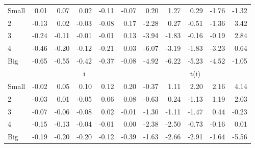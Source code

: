 \begin{table}[!ht]
\begin{tabular}{lrrrrrrrrrr}
    \\
      \cmidrule(r){2-6} \cmidrule(r){7-11}

    Small   & 0.01  & 0.07  & 0.02  & -0.11  & -0.07  & 0.20  & 1.27  & 0.29  & -1.76  & -1.32  \\
         2  & -0.13  & 0.02  & -0.03  & -0.08  & 0.17  & -2.28  & 0.27  & -0.51  & -1.36  & 3.42  \\
         3  & -0.24  & -0.11  & -0.01  & -0.01  & 0.13  & -3.94  & -1.83  & -0.16  & -0.19  & 2.84  \\
         4  & -0.46  & -0.20  & -0.12  & -0.21  & 0.03  & -6.07  & -3.19  & -1.83  & -3.23  & 0.64  \\
    Big     & -0.65  & -0.55  & -0.42  & -0.37  & -0.08  & -4.92  & -6.22  & -5.23  & -4.52  & -1.05  \\

  
    
      & \multicolumn{5}{c}{i} & \multicolumn{5}{c}{t(i)}
    
    \\
      \cmidrule(r){2-6} \cmidrule(r){7-11}

    Small   & -0.02  & 0.05  & 0.10  & 0.12  & 0.20  & -0.37  & 1.11  & 2.20  & 2.16  & 4.14  \\
         2  & -0.03  & 0.01  & -0.05  & 0.06  & 0.08  & -0.63  & 0.24  & -1.13  & 1.19  & 2.03  \\
         3  & -0.07  & -0.06  & -0.08  & 0.02  & -0.01  & -1.30  & -1.11  & -1.47  & 0.44  & -0.23  \\
         4  & -0.15  & -0.13  & -0.04  & -0.01  & 0.00  & -2.38  & -2.50  & -0.73  & -0.16  & 0.01  \\
    Big     & -0.19  & -0.20  & -0.20  & -0.12  & -0.39  & -1.63  & -2.66  & -2.91  & -1.64  & -5.56  \\

  

  \bottomrule
\end{tabular}
\label{tbl:25_Size_Var_FF2016}
\end{table}